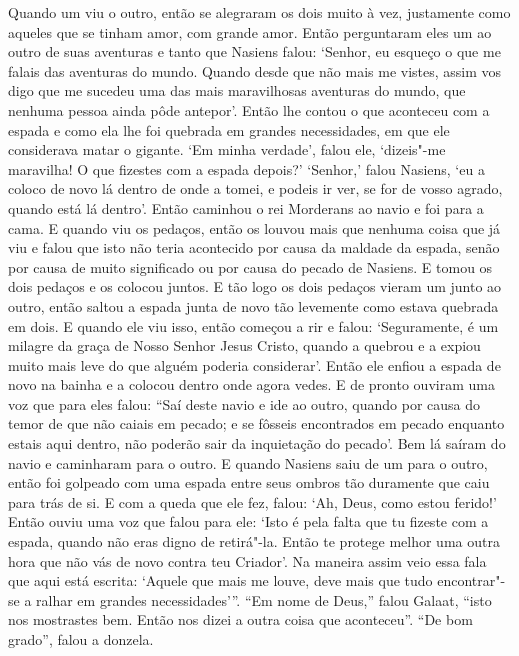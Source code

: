 Quando um viu o outro, então se alegraram os dois muito à vez, justamente como
aqueles que se tinham amor, com grande amor. Então perguntaram eles um ao outro
de suas aventuras e tanto que Nasiens falou: ‘Senhor, eu esqueço o que me
falais das aventuras do mundo. Quando desde que não mais me vistes, assim vos
digo que me sucedeu uma das mais maravilhosas aventuras do mundo, que nenhuma
pessoa ainda pôde antepor’. Então lhe contou o que aconteceu com a espada e como
ela lhe foi quebrada em grandes necessidades, em que ele considerava matar o
gigante. ‘Em minha verdade’, falou ele, ‘dizeis"-me maravilha! O que fizestes
com a espada depois?’ ‘Senhor,’ falou Nasiens, ‘eu a coloco de novo lá dentro
de onde a tomei, e podeis ir ver, se for de vosso agrado, quando está lá
dentro’. Então caminhou o rei Morderans ao navio e foi para a cama. E quando
viu os pedaços, então os louvou mais que nenhuma coisa que já viu e falou que
isto não teria acontecido por causa da maldade da espada, senão por causa de
muito significado ou por causa do pecado de Nasiens. E tomou os dois pedaços e
os colocou juntos. E tão logo os dois pedaços vieram um junto ao outro, então
saltou a espada junta de novo tão levemente como estava quebrada em dois. E
quando ele viu isso, então começou a rir e falou: ‘Seguramente, é um milagre da
graça de Nosso Senhor Jesus Cristo, quando a quebrou e a expiou muito mais leve
do que alguém poderia considerar’. Então ele enfiou a espada de novo na bainha
e a colocou dentro onde agora vedes. E de pronto ouviram uma voz que para eles
falou: “Saí deste navio e ide ao outro, quando por causa do temor de que não
caiais em pecado; e se fôsseis encontrados em pecado enquanto estais aqui
dentro, não poderão sair da inquietação do pecado’. Bem lá saíram do navio e
caminharam para o outro. E quando Nasiens saiu de um para o outro, então foi
golpeado com uma espada entre seus ombros tão duramente que caiu para trás de
si. E com a queda que ele fez, falou: ‘Ah, Deus, como estou ferido!’ Então
ouviu uma voz que falou para ele: ‘Isto é pela falta que tu fizeste com a
espada, quando não eras digno de retirá"-la. Então te protege melhor uma outra
hora que não vás de novo contra teu Criador’. Na maneira assim veio essa fala
que aqui está escrita: ‘Aquele que mais me louve, deve mais que tudo encontrar"-se
a ralhar em grandes necessidades’”. “Em nome de Deus,” falou
Galaat, “isto nos mostrastes bem. Então nos dizei a outra coisa que aconteceu”. “De
bom grado”, falou a donzela.

